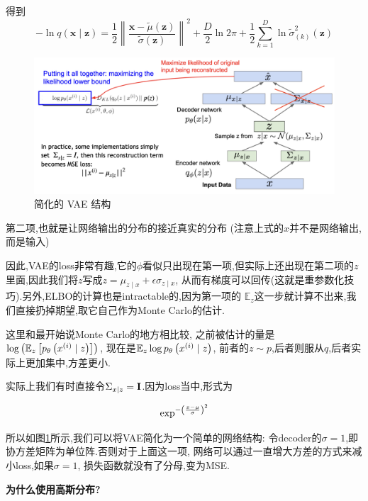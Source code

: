 	得到
	\begin{equation}
		-\ln q(\bm x \mid \bm z)=\frac{1}{2}\left\|\frac{\bm x-\tilde{\mu}(\bm z)}{\tilde{\sigma}(\bm z)}\right\|^{2}+\frac{D}{2} \ln 2 \pi+\frac{1}{2} \sum_{k=1}^{D} \ln \tilde{\sigma}_{(k)}^{2}(\bm z)
	\end{equation}

	\begin{figure}[htbp]
		\centering
		\includegraphics[scale=0.2]{figures/simple_VAE.png}
		\caption{简化的 VAE 结构}
		\label{fig:simple_VAE}
	\end{figure}

	第二项,也就是让网络输出的分布的接近真实的分布
	(注意上式的$x$并不是网络输出,而是输入)
	
	因此,VAE的loss非常有趣,它的$\phi$看似只出现在第一项,但实际上还出现在第二项的$z$
	里面,因此我们将$z$写成$z=\mu_{z \mid x}+\epsilon \sigma_{z \mid x}$,
	从而有梯度可以回传(这就是重参数化技巧).另外,ELBO的计算也是intractable的,因为第一项的
	$\mathbb{E}_{z}$这一步就计算不出来,我们直接扔掉期望,取它自己作为Monte Carlo的估计.
	
	这里和最开始说Monte Carlo的地方相比较,
	之前被估计的量是$\log\left( \mathbb{E}_z \left[ p_{\theta} \left( x^{(i)}  \mid z\right)\right]\right)$,
	现在是$\mathbb{E}_{z} \log p_{\theta} \left( x^{(i)}\mid z\right)$,
	前者的$z \sim p$,后者则服从$q$,后者实际上更加集中,方差更小.
	
	实际上我们有时直接令$\Sigma_{x \mid z} = \bold{I}$.因为loss当中,形式为

	\begin{equation}
		\exp^{-\left( \frac{x - \mu}{\sigma}\right)^2}
	\end{equation}

	所以如图\ref{fig:simple_VAE}所示,我们可以将VAE简化为一个简单的网络结构:
	令decoder的$\sigma = 1$,即协方差矩阵为单位阵.否则对于上面这一项,
	网络可以通过一直增大方差的方式来减小loss,如果$\sigma = 1$,
	损失函数就没有了分母,变为MSE.

	\textbf{为什么使用高斯分布?}
	
